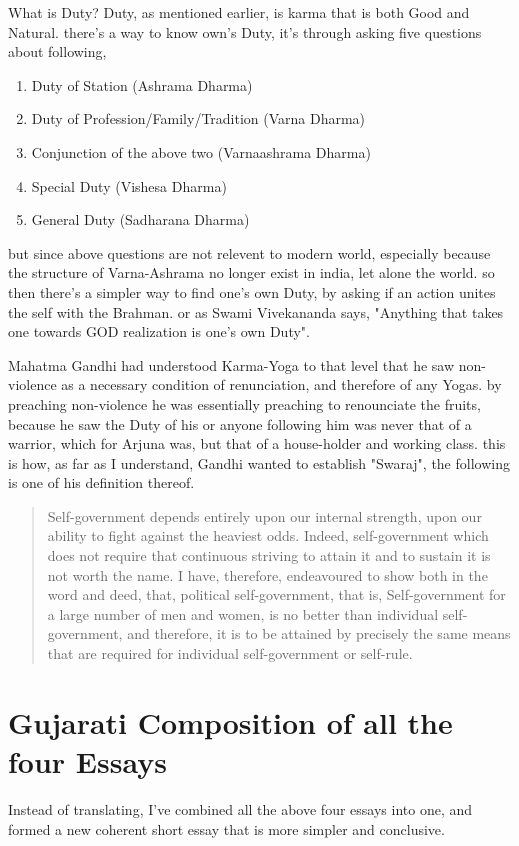 \documentclass[a4paper]{article}
\begin{document}
What is Duty? Duty, as mentioned earlier, is karma that is both Good and Natural.
there's a way to know own's Duty, it's through asking five questions about following,
\begin{enumerate}
    \item Duty of Station (Ashrama Dharma)
    \item Duty of Profession/Family/Tradition (Varna Dharma)
    \item Conjunction of the above two (Varnaashrama Dharma)
    \item Special Duty (Vishesa Dharma)
    \item General Duty (Sadharana Dharma)
\end{enumerate}
but since above questions are not relevent to modern world, especially because the structure of
Varna-Ashrama no longer exist in india, let alone the world. so then there's a simpler way to find 
one's own Duty, by asking if an action unites the self with the Brahman. or as Swami Vivekananda says,
"Anything that takes one towards GOD realization is one's own Duty".

Mahatma Gandhi had understood Karma-Yoga to that level that he saw non-violence as a necessary condition 
of renunciation, and therefore of any Yogas. by preaching non-violence he was essentially preaching
to renounciate the fruits, because he saw the Duty of his or anyone following him was never that of 
a warrior, which for Arjuna was, but that of a house-holder and working class. this is how, as far as
I understand, Gandhi wanted to establish "Swaraj", the following is one of his definition thereof.
\begin{quote}    
Self-government depends entirely upon our internal strength, upon our ability to fight against the heaviest odds. Indeed, self-government which does not require that continuous striving to attain it and to sustain it is not worth the name. I have, therefore, endeavoured to show both in the word and deed, that, political self-government, that is, Self-government for a large number of men and women, is no better than individual self-government, and therefore, it is to be attained by precisely the same means that are required for individual self-government or self-rule.
\end{quote}


\section{Gujarati Composition of all the four Essays}
Instead of translating, I've combined all the above four essays into one, 
and formed a new coherent short essay that is more simpler and conclusive.
\end{document}
